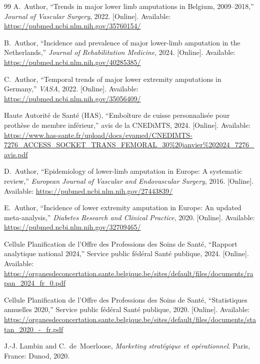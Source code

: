 \begin{thebibliography}{99}
A.~Author, ``Trends in major lower limb amputations in Belgium, 2009--2018,'' \emph{Journal of Vascular Surgery}, 2022. [Online]. Available: \url{https://pubmed.ncbi.nlm.nih.gov/35760154/}

B.~Author, ``Incidence and prevalence of major lower-limb amputation in the Netherlands,'' \emph{Journal of Rehabilitation Medicine}, 2024. [Online]. Available: \url{https://pubmed.ncbi.nlm.nih.gov/40285385/}

C.~Author, ``Temporal trends of major lower extremity amputations in Germany,'' \emph{VASA}, 2022. [Online]. Available: \url{https://pubmed.ncbi.nlm.nih.gov/35056409/}

Haute Autorité de Santé (HAS), ``Emboîture de cuisse personnalisée pour prothèse de membre inférieur,'' avis de la CNEDiMTS, 2024. [Online]. Available: \url{https://www.has-sante.fr/upload/docs/evamed/CNEDIMTS-7276_ACCESS_SOCKET_TRANS_FEMORAL_30%20janvier%202024_7276_avis.pdf}

D.~Author, ``Epidemiology of lower-limb amputation in Europe: A systematic review,'' \emph{European Journal of Vascular and Endovascular Surgery}, 2016. [Online]. Available: \url{https://pubmed.ncbi.nlm.nih.gov/27443839/}

E.~Author, ``Incidence of lower extremity amputation in Europe: An updated meta-analysis,'' \emph{Diabetes Research and Clinical Practice}, 2020. [Online]. Available: \url{https://pubmed.ncbi.nlm.nih.gov/32709465/}

Cellule Planification de l'Offre des Professions des Soins de Santé, ``Rapport analytique national 2024,'' Service public fédéral Santé publique, 2024. [Online]. Available: \url{https://organesdeconcertation.sante.belgique.be/sites/default/files/documents/rapan_2024_fr_0.pdf}

Cellule Planification de l'Offre des Professions des Soins de Santé, ``Statistiques annuelles 2020,'' Service public fédéral Santé publique, 2020. [Online]. Available: \url{https://organesdeconcertation.sante.belgique.be/sites/default/files/documents/statan_2020_-_fr.pdf}

J.-J. Lambin and C.~de~Moerloose, \emph{Marketing stratégique et opérationnel}. Paris, France: Dunod, 2020.


\end{thebibliography}
